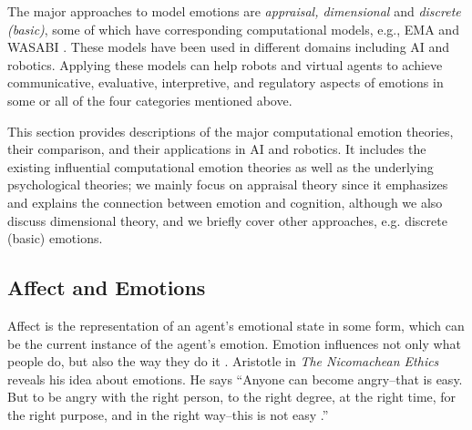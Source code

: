 \documentclass[12pt]{report}
\begin{document}
The major approaches to model emotions are \textit{appraisal, dimensional} and
\textit{discrete (basic)}, some of which have corresponding computational
models, e.g., EMA \cite{marsella:ema-process-model} and WASABI
\cite{becker:wasabi,becker:wasabi-description}. These models have been used in
different domains including AI and robotics. Applying these models can help
robots and virtual agents to achieve communicative, evaluative, interpretive,
and regulatory aspects of emotions in some or all of the four categories
mentioned above.

This section provides descriptions of the major computational emotion theories,
their comparison, and their applications in AI and robotics. It includes the
existing influential computational emotion theories as well as the underlying
psychological theories; we mainly focus on appraisal theory since it
emphasizes and explains the connection between emotion and cognition, although we also
discuss dimensional theory, and we briefly cover other approaches, e.g.
discrete (basic) emotions.

\subsection{Affect and Emotions}
Affect is the representation of an agent's emotional state in some form, which
can be the current instance of the agent's emotion. Emotion influences not only
what people do, but also the way they do it \cite{cowie:concepts-definitions}.
Aristotle in \emph{The Nicomachean Ethics} reveals his idea about emotions. He
says ``Anyone can become angry--that is easy. But to be angry with the right
person, to the right degree, at the right time, for the right purpose, and in
the right way--this is not easy \cite{aristotle:ethics}.''
\end{document}
